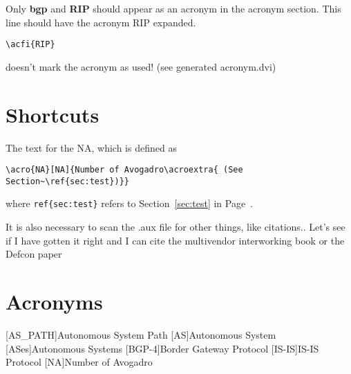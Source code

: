\documentclass[a4paper,11pt]{article}
\begin{document}
Only \textbf{\ac{bgp}} and \textbf{\ac{RIP}} should appear as an
acronym in the acronym section. This line should have the acronym
\ac{RIP} expanded. 
\begin{verbatim}
\acfi{RIP}
\end{verbatim}
doesn't mark the acronym as used! (see generated acronym.dvi)

\section{Shortcuts}
\label{sec:shortcut}

The text for the \ac{NA}, which is defined as
\begin{verbatim}
\acro{NA}[NA]{Number of Avogadro\acroextra{ (See Section~\ref{sec:test})}}
\end{verbatim}
where \texttt{ref\{sec:test\}} refers to Section~\ref{sec:test} in
Page~\pageref{sec:test}.

It is also necessary to scan the .aux file for other things, like
citations.. Let's see if I have gotten it right and I can cite the
multivendor interworking book \cite{Goralski-cisco-juniper} or the
Defcon paper \cite{defcon16-bgp}

\section*{Acronyms}
\begin{acronym}[BGP-4]
[AS\_PATH]{Autonomous System Path}
[AS]{Autonomous System}
[ASes]{Autonomous Systems}
[BGP-4]{Border Gateway Protocol}
[IS-IS]{IS-IS Protocol}
[NA]{Number of Avogadro}
\end{acronym}



\end{document}
